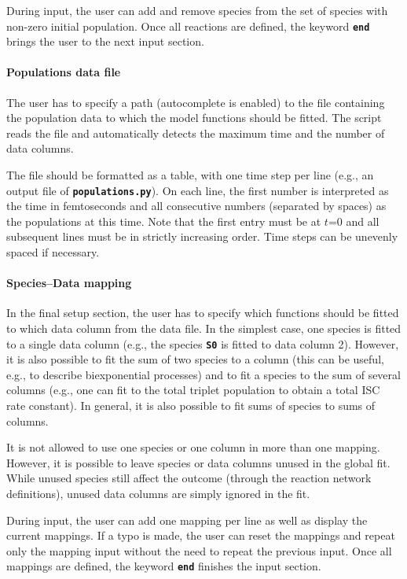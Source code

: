 \documentclass[a4paper,10pt,DIV=15,openany]{scrbook}
\newcommand{\ttt}[1]{\textbf{\texttt{#1}}}
\begin{document}
During input, the user can add and remove species from the set of species with non-zero initial population.
Once all reactions are defined, the keyword \ttt{end} brings the user to the next input section.

\paragraph{Populations data file}

The user has to specify a path (autocomplete is enabled) to the file containing the population data to which the model functions should be fitted.
The script reads the file and automatically detects the maximum time and the number of data columns.

The file should be formatted as a table, with one time step per line (e.g., an output file of \ttt{populations.py}). 
On each line, the first number is interpreted as the time in femtoseconds and all consecutive numbers (separated by spaces) as the populations at this time.
Note that the first entry must be at $t$=0 and all subsequent lines must be in strictly increasing order.
Time steps can be unevenly spaced if necessary.

\paragraph{Species--Data mapping}

In the final setup section, the user has to specify which functions should be fitted to which data column from the data file.
In the simplest case, one species is fitted to a single data column (e.g., the species \ttt{S0} is fitted to data column 2).
However, it is also possible to fit the sum of two species to a column (this can be useful, e.g., to describe biexponential processes) and to fit a species to the sum of several columns (e.g., one can fit to the total triplet population to obtain a total ISC rate constant).
In general, it is also possible to fit sums of species to sums of columns.

It is not allowed to use one species or one column in more than one mapping.
However, it is possible to leave species or data columns unused in the global fit. 
While unused species still affect the outcome (through the reaction network definitions), unused data columns are simply ignored in the fit.

During input, the user can add one mapping per line as well as display the current mappings.
If a typo is made, the user can reset the mappings and repeat only the mapping input without the need to repeat the previous input.
Once all mappings are defined, the keyword \ttt{end} finishes the input section.
\end{document}
